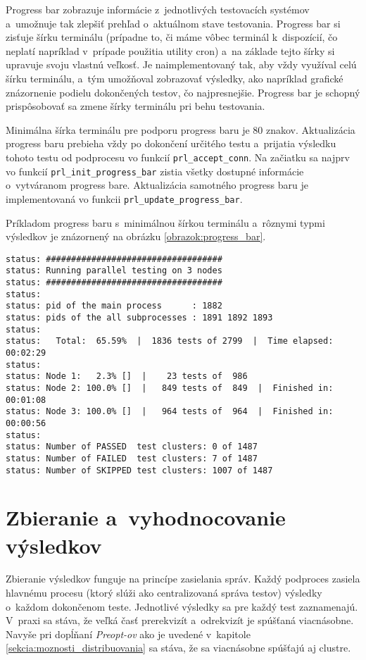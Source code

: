 Progress bar zobrazuje informácie z~jednotlivých testovacích systémov 
a~umožnuje tak zlepšiť prehľad o~aktuálnom stave testovania. 
Progress bar si zisťuje šírku terminálu (prípadne to, či máme vôbec terminál
k~dispozícií, čo neplatí napríklad v~prípade použitia utility cron) a~na základe tejto šírky si upravuje svoju vlastnú veľkosť.
Je naimplementovaný tak, aby vždy využíval celú šírku terminálu, a~tým
umožňoval zobrazovať výsledky, ako napríklad grafické znázornenie podielu
dokončených testov, čo najpresnejšie. Progress bar je schopný prispôsobovať
sa zmene šírky terminálu pri behu testovania.

Minimálna šírka terminálu pre podporu progress baru je 80 znakov.
Aktualizácia progress baru prebieha vždy po dokončení určitého testu
a~prijatia výsledku tohoto testu od podprocesu vo funkcií \texttt{prl\_accept\_conn}.
Na začiatku sa najprv vo funkcií \texttt{prl\_init\_progress\_bar} zistia všetky dostupné
informácie o~vytváranom progress bare. Aktualizácia samotného progress baru je implementovaná
vo funkcii \texttt{prl\_update\_progress\_bar}.

Príkladom progress baru s~minimálnou šírkou terminálu a~rôznymi 
typmi výsledkov je znázornený na obrázku
\ref{obrazok:progress_bar}.

\begin{lstlisting}[caption=Ukážka progress baru so šírkou terminálu 80 znakov,label=obrazok:progress_bar]
status: ###################################
status: Running parallel testing on 3 nodes
status: ###################################
status: 
status: pid of the main process      : 1882
status: pids of the all subprocesses : 1891 1892 1893
status: 
status:   Total:  65.59%  |  1836 tests of 2799  |  Time elapsed: 00:02:29      
status:                                                                         
status: Node 1:   2.3% []  |    23 tests of  986                                
status: Node 2: 100.0% []  |   849 tests of  849  |  Finished in: 00:01:08      
status: Node 3: 100.0% []  |   964 tests of  964  |  Finished in: 00:00:56      
status:                                                                         
status: Number of PASSED  test clusters: 0 of 1487                              
status: Number of FAILED  test clusters: 7 of 1487                              
status: Number of SKIPPED test clusters: 1007 of 1487
\end{lstlisting}


\section{Zbieranie a~vyhodnocovanie výsledkov}
\label{sekcia:zbieranie_vysledkov}
Zbieranie výsledkov funguje na princípe zasielania správ. 
Každý podproces zasiela hlavnému procesu (ktorý slúži ako centralizovaná
správa testov) výsledky o~každom dokončenom teste. Jednotlivé výsledky sa
pre každý test zaznamenajú. V~praxi sa stáva, že veľká časť prerekvizít
a~odrekvizít je spúšťaná viacnásobne. Navyše pri dopĺňaní \textit{Preopt-ov}
ako je uvedené v~kapitole \ref{sekcia:moznosti_distribuovania} sa stáva, 
že sa viacnásobne spúšťajú aj clustre. 

